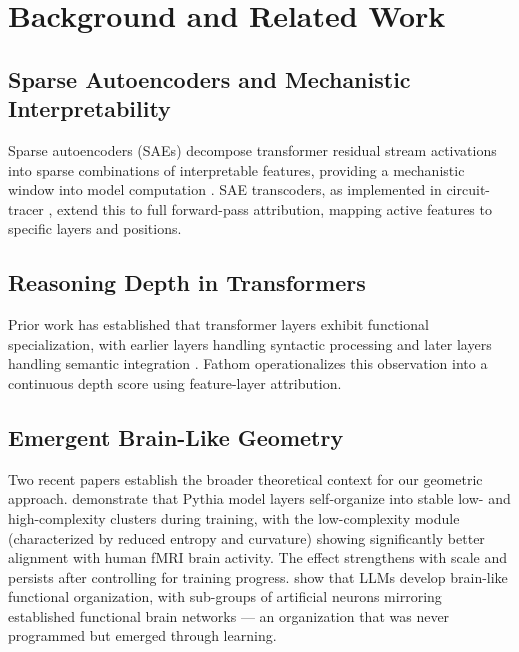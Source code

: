 \documentclass[10pt]{article}
\begin{document}
\section{Background and Related Work}

\subsection{Sparse Autoencoders and Mechanistic Interpretability}

Sparse autoencoders (SAEs) decompose transformer residual stream activations into sparse combinations of interpretable features, providing a mechanistic window into model computation \citep{cunningham2023, bricken2023}. SAE transcoders, as implemented in circuit-tracer \citep{lindsey2024}, extend this to full forward-pass attribution, mapping active features to specific layers and positions.

\subsection{Reasoning Depth in Transformers}

Prior work has established that transformer layers exhibit functional specialization, with earlier layers handling syntactic processing and later layers handling semantic integration \citep{tenney2019, rogers2020}. Fathom operationalizes this observation into a continuous depth score using feature-layer attribution.

\subsection{Emergent Brain-Like Geometry}

Two recent papers establish the broader theoretical context for our geometric approach. \citet{ma2026} demonstrate that Pythia model layers self-organize into stable low- and high-complexity clusters during training, with the low-complexity module (characterized by reduced entropy and curvature) showing significantly better alignment with human fMRI brain activity. The effect strengthens with scale and persists after controlling for training progress. \citet{wang2024} show that LLMs develop brain-like functional organization, with sub-groups of artificial neurons mirroring established functional brain networks --- an organization that was never programmed but emerged through learning.
\end{document}
